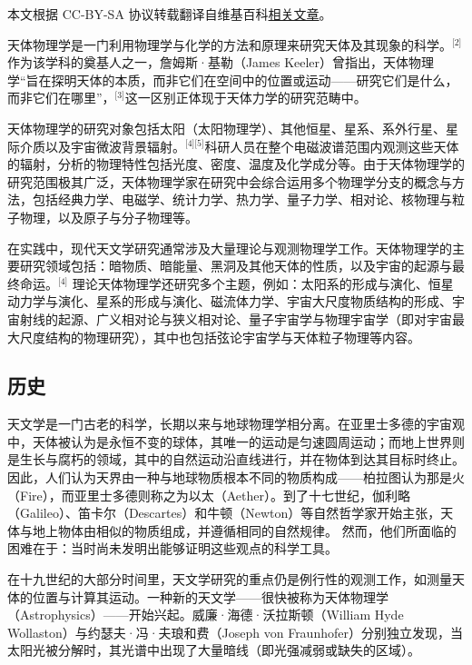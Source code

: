 
本文根据 CC-BY-SA 协议转载翻译自维基百科\href{https://en.wikipedia.org/wiki/Astrophysics?utm_source=chatgpt.com}{相关文章}。


天体物理学是一门利用物理学与化学的方法和原理来研究天体及其现象的科学。\(^\text{[2]}\)作为该学科的奠基人之一，詹姆斯·基勒（James Keeler）曾指出，天体物理学“旨在探明天体的本质，而非它们在空间中的位置或运动——研究它们是什么，而非它们在哪里”，\(^\text{[3]}\)这一区别正体现于天体力学的研究范畴中。

天体物理学的研究对象包括太阳（太阳物理学）、其他恒星、星系、系外行星、星际介质以及宇宙微波背景辐射。\(^\text{[4][5]}\)科研人员在整个电磁波谱范围内观测这些天体的辐射，分析的物理特性包括光度、密度、温度及化学成分等。由于天体物理学的研究范围极其广泛，天体物理学家在研究中会综合运用多个物理学分支的概念与方法，包括经典力学、电磁学、统计力学、热力学、量子力学、相对论、核物理与粒子物理，以及原子与分子物理等。

在实践中，现代天文学研究通常涉及大量理论与观测物理学工作。天体物理学的主要研究领域包括：暗物质、暗能量、黑洞及其他天体的性质，以及宇宙的起源与最终命运。\(^\text{[4]}\)
理论天体物理学还研究多个主题，例如：太阳系的形成与演化、恒星动力学与演化、星系的形成与演化、磁流体力学、宇宙大尺度物质结构的形成、宇宙射线的起源、广义相对论与狭义相对论、量子宇宙学与物理宇宙学（即对宇宙最大尺度结构的物理研究），其中也包括弦论宇宙学与天体粒子物理等内容。
\subsection{历史}
天文学是一门古老的科学，长期以来与地球物理学相分离。在亚里士多德的宇宙观中，天体被认为是永恒不变的球体，其唯一的运动是匀速圆周运动；而地上世界则是生长与腐朽的领域，其中的自然运动沿直线进行，并在物体到达其目标时终止。因此，人们认为天界由一种与地球物质根本不同的物质构成——柏拉图认为那是火（Fire），而亚里士多德则称之为以太（Aether）。\cite{ref6,ref7}到了十七世纪，伽利略（Galileo）、笛卡尔（Descartes）和牛顿（Newton）等自然哲学家开始主张，天体与地上物体由相似的物质组成，并遵循相同的自然规律。\cite{ref8,ref9,ref10,ref11} 然而，他们所面临的困难在于：当时尚未发明出能够证明这些观点的科学工具。\cite{ref12}


在十九世纪的大部分时间里，天文学研究的重点仍是例行性的观测工作，如测量天体的位置与计算其运动。\cite{ref13,ref14}一种新的天文学——很快被称为天体物理学（Astrophysics）——开始兴起。威廉·海德·沃拉斯顿（William Hyde Wollaston）与约瑟夫·冯·夫琅和费（Joseph von Fraunhofer）分别独立发现，当太阳光被分解时，其光谱中出现了大量暗线（即光强减弱或缺失的区域）。\cite{ref15}


